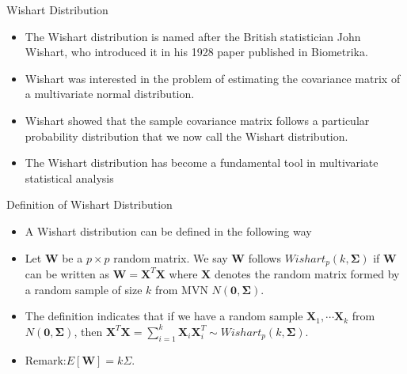 \documentclass[
  ignorenonframetext,
]{beamer}
\begin{document}
\begin{frame}{Wishart Distribution}
\protect\hypertarget{wishart-distribution}{}
\begin{itemize}
\item
  The Wishart distribution is named after the British statistician John
  Wishart, who introduced it in his 1928 paper published in Biometrika.
\item
  Wishart was interested in the problem of estimating the covariance
  matrix of a multivariate normal distribution.
\item
  Wishart showed that the sample covariance matrix follows a particular
  probability distribution that we now call the Wishart distribution.
\item
  The Wishart distribution has become a fundamental tool in multivariate
  statistical analysis
\end{itemize}
\end{frame}

\begin{frame}{Definition of Wishart Distribution}
\protect\hypertarget{definition-of-wishart-distribution}{}
\begin{itemize}
\item
  A Wishart distribution can be defined in the following way
\item
  Let \(\mathbf W\) be a \(p\times p\) random matrix. We say
  \(\mathbf W\) follows \(Wishart_{p}(k, \boldsymbol \Sigma)\) if
  \(\mathbf W\) can be written as \(\mathbf W=\mathbf X^T \mathbf X\)
  where \(\mathbf X\) denotes the random matrix formed by a random
  sample of size \(k\) from MVN \(N(\mathbf 0, \boldsymbol \Sigma)\).
\item
  The definition indicates that if we have a random sample
  \(\mathbf X_1, \cdots \mathbf X_k\) from
  \(N(\mathbf 0, \boldsymbol \Sigma)\), then
  \(\mathbf X^T \mathbf X=\sum_{i=1}^k \mathbf X_i \mathbf X_i^T \sim Wishart_p(k, \boldsymbol \Sigma)\).
\item
  Remark:\(E[\mathbf W]=k\Sigma\).
\end{itemize}
\end{frame}
\end{document}

